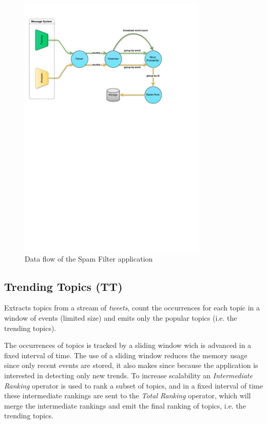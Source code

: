 \documentclass[ppgc,diss,english]{iiufrgs}
\begin{document}
\begin{figure}[!ht]
	\centering
	\includegraphics[width=0.8\textwidth]{images/apps/SpamFilter.pdf}
	\caption{Data flow of the Spam Filter application}
	\label{fig:app_spam_filter}
\end{figure}

\subsection{Trending Topics (TT)}

Extracts topics from a stream of \textit{tweets}, count the occurrences for each topic in a window of events (limited size) and emits only the popular topics (i.e. the trending topics).

The occurrences of topics is tracked by a sliding window wich is advanced in a fixed interval of time. The use of a sliding window reduces the memory usage since only recent events are stored, it also makes since because the application is interested in detecting only new trends. To increase scalability an \emph{Intermediate Ranking} operator is used to rank a subset of topics, and in a fixed interval of time these intermediate rankings are sent to the \emph{Total Ranking} operator, which will merge the intermediate rankings and emit the final ranking of topics, i.e. the trending topics.
\end{document}
